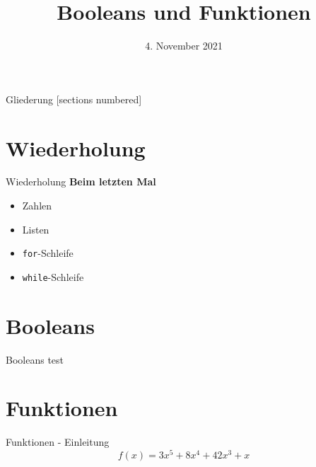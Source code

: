 



\title{Booleans und Funktionen}
\date{4. November 2021}

\usepackage{graphicx}


	
\maketitle

\begin{frame}{Gliederung}
	[sections numbered]
	\tableofcontents
\end{frame}


\section{Wiederholung}
\begin{frame}{Wiederholung}
	\textbf{Beim letzten Mal}
	\begin{itemize}
		\item Zahlen
		\item Listen
		
		\item \alert{\texttt{for}}-Schleife
		
		\item \alert{\texttt{while}}-Schleife
		
	\end{itemize}
\end{frame}

\section{Booleans}
\begin{frame}{Booleans}
	test	
\end{frame}

\section{Funktionen}
\begin{frame}{Funktionen - Einleitung}
		\Large $$ f(x) = 3x^5 + 8x^4 + 42x^3 + x $$
\end{frame}


